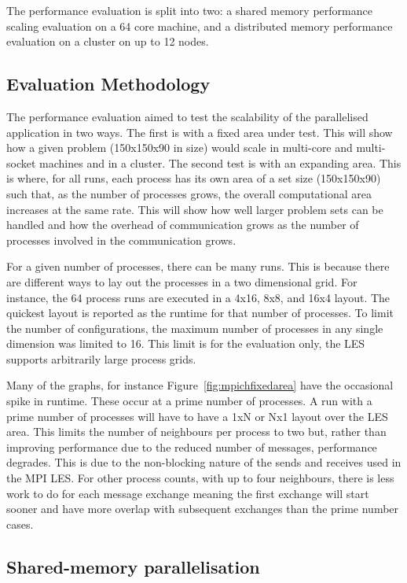 The performance evaluation is split into two: a shared memory performance
scaling evaluation on a 64 core machine, and a distributed memory performance
evaluation on a cluster on up to 12 nodes.

\subsection{Evaluation Methodology}
\label{sec:mpievaluationmethodology}

The performance evaluation aimed to test the scalability of the parallelised
application in two ways. The first is with a fixed area under test. This will
show how a given problem (150x150x90 in size) would scale in multi-core and
multi-socket machines and in a cluster. The second test is with an expanding
area. This is where, for all runs, each process has its own area of a set size
(150x150x90) such that, as the number of processes grows, the overall
computational area increases at the same rate. This will show how well larger
problem sets can be handled and how the overhead of communication grows as the
number of processes involved in the communication grows.

For a given number of processes, there can be many runs. This is because there
are different ways to lay out the processes in a two dimensional grid. For
instance, the 64 process runs are executed in a 4x16, 8x8, and 16x4 layout. The
quickest layout is reported as the runtime for that number of processes. To
limit the number of configurations, the maximum number of processes in any
single dimension was limited to 16. This limit is for the evaluation only, the
LES supports arbitrarily large process grids.

Many of the graphs, for instance Figure~\ref{fig:mpichfixedarea} have the
occasional spike in runtime. These occur at a prime number of processes. A run
with a prime number of processes will have to have a 1xN or Nx1 layout over the
LES area. This limits the number of neighbours per process to two but, rather
than improving performance due to the reduced number of messages, performance
degrades. This is due to the non-blocking nature of the sends and receives used
in the MPI LES. For other process counts, with up to four neighbours, there is
less work to do for each message exchange meaning the first exchange will start
sooner and have more overlap with subsequent exchanges than the prime number
cases.

\subsection{Shared-memory parallelisation}


